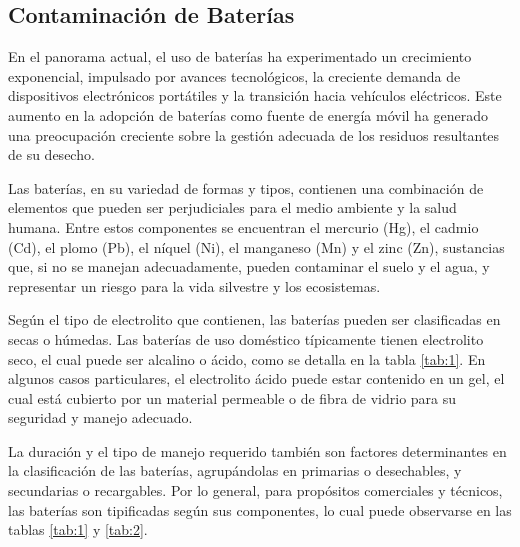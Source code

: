             \subsection{Contaminación de Baterías}
                En el panorama actual, el uso de baterías ha experimentado un crecimiento exponencial, impulsado por avances tecnológicos, la creciente demanda de dispositivos electrónicos portátiles y la transición hacia vehículos eléctricos. Este aumento en la adopción de baterías como fuente de energía móvil ha generado una preocupación creciente sobre la gestión adecuada de los residuos resultantes de su desecho.\par
                Las baterías, en su variedad de formas y tipos, contienen una combinación de elementos que pueden ser perjudiciales para el medio ambiente y la salud humana. Entre estos componentes se encuentran el mercurio (Hg), el cadmio (Cd), el plomo (Pb), el níquel (Ni), el manganeso (Mn) y el zinc (Zn), sustancias que, si no se manejan adecuadamente, pueden contaminar el suelo y el agua, y representar un riesgo para la vida silvestre y los ecosistemas.\par
                Según el tipo de electrolito que contienen, las baterías pueden ser clasificadas en secas o húmedas. Las baterías de uso doméstico típicamente tienen electrolito seco, el cual puede ser alcalino o ácido, como se detalla en la tabla \ref{tab:1}. En algunos casos particulares, el electrolito ácido puede estar contenido en un gel, el cual está cubierto por un material permeable o de fibra de vidrio para su seguridad y manejo adecuado.\par
                La duración y el tipo de manejo requerido también son factores determinantes en la clasificación de las baterías, agrupándolas en primarias o desechables, y secundarias o recargables. Por lo general, para propósitos comerciales y técnicos, las baterías son tipificadas según sus componentes, lo cual puede observarse en las tablas \ref{tab:1} y \ref{tab:2}.\par
                
